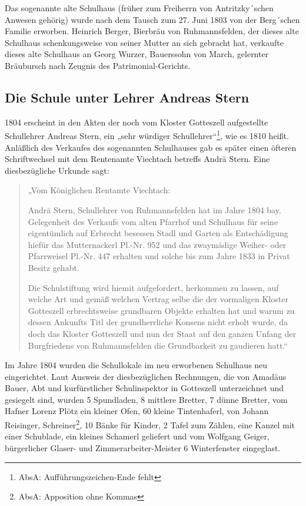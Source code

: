 \documentclass[12pt,a4paper]{book}
\begin{document}
Das sogenannte alte Schulhaus (früher zum Freiherrn von Antritzky´schen Anwesen
gehörig) wurde nach dem Tausch zum 27. Juni 1803 von der Berg´schen Familie
erworben. Heinrich Berger, Bierbräu von Ruhmannsfelden, der dieses alte
Schulhaus schenkungsweise von seiner Mutter an sich gebracht hat, verkaufte
dieses alte Schulhaus an Georg Wurzer, Bauerssohn von March, gelernter
Bräubursch nach Zeugnis des Patrimonial-Gerichts.

\subsection[Die Schule unter Lehrer Andreas Stern]{Die Schule unter Lehrer Andreas
Stern\protect\footnotemark{}\protect{}}

1804 erscheint in den Akten der noch vom Kloster Gotteszell aufgestellte
Schullehrer Andreas Stern, ein „sehr würdiger Schullehrer“\footnote{AbsA:
Aufführungszeichen-Ende fehlt}, wie es 1810 heißt. Anläßlich des Verkaufes des
sogenannten Schulhauses gab es später einen öfteren Schriftwechsel mit dem
Rentenamte Viechtach betreffs Andrä Stern. Eine diesbezügliche Urkunde sagt:

\begin{quote}
„Vom Königlichen Rentamte Viechtach:

Andrä Stern, Schullehrer von Ruhmannsfelden hat im Jahre 1804 bay. Gelegenheit
des Verkaufs vom alten Pfarrhof und Schulhaus für seine eigentümlich auf
Erbrecht besessen Stadl und Garten als Entschädigung hiefür das Mutternackerl
Pl.-Nr. 952 und das zwaymädige Weiher- oder Pfarrweisel Pl.-Nr. 447 erhalten und
solche bis zum Jahre 1833 in Privat Besitz gehabt.

Die Schulstiftung wird hiemit aufgefordert, herkommen zu lassen, auf welche Art
und gemäß welchen Vertrag selbe die der vormaligen Kloster Gotteszell
erbrechtsweise grundbaren Objekte erhalten hat und warum zu dessen Ankunfts Titl
der grundherrliche Konsens nicht erholt wurde, da doch das Kloster Gotteszell
und nun der Staat auf den ganzen Unfang der Burgfriedens von Ruhmannsfelden die
Grundbarkeit zu gaudieren hatt.“
\end{quote}

Im Jahre 1804 wurden die Schullokale im neu erworbenen Schulhaus neu
eingerichtet. Laut Ausweis der diesbezüglichen Rechnungen, die von Amadäus
Bauer, Abt und kurfürstlicher Schulinspektor in Gotteszell unterzeichnet und
gesiegelt sind, wurden 5 Spundladen, 8 mittlere Bretter, 7 dünne Bretter, vom
Hafner Lorenz Plötz ein kleiner Ofen, 60 kleine Tintenhaferl, von Johann
Reisinger, Schreiner\footnote{AbsA: Apposition ohne Kommas}, 10 Bänke für
Kinder, 2 Tafel zum Zählen, eine Kanzel mit einer Schublade, ein kleines
Schamerl geliefert und vom Wolfgang Geiger, bürgerlicher Glaser- und
Zimmerarbeiter-Meister 6 Winterfenster eingeglast.
\end{document}
